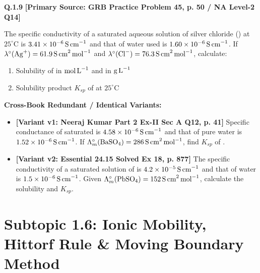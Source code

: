 \begin{problembox}
\textbf{Q.1.9} \hfill \textbf{[Primary Source: GRB Practice Problem 45, p. 50 / NA Level-2 Q14]}
\label{q:qb-c1-09}

The specific conductivity of a saturated aqueous solution of silver chloride () at $25^\circ\text{C}$ is $3.41 \times 10^{-6}\,\text{S\,cm}^{-1}$ and that of water used is $1.60 \times 10^{-6}\,\text{S\,cm}^{-1}$. If $\lambda^\circ(\ce{Ag+}) = 61.9\,\text{S\,cm}^2\,\text{mol}^{-1}$ and $\lambda^\circ(\ce{Cl-}) = 76.3\,\text{S\,cm}^2\,\text{mol}^{-1}$, calculate:
\begin{enumerate}[label=(\alph*)]
    \item Solubility of  in $\text{mol\,L}^{-1}$ and in $\text{g\,L}^{-1}$
    \item Solubility product $K_{sp}$ of  at $25^\circ\text{C}$
\end{enumerate}

\tcbline
\textbf{\color{accentamber}Cross-Book Redundant / Identical Variants:}
\begin{itemize}[leftmargin=*,itemsep=2pt]
    \item \textbf{[Variant v1: Neeraj Kumar Part 2 Ex-II Sec A Q12, p. 41]} Specific conductance of saturated  is $4.58 \times 10^{-6}\,\text{S\,cm}^{-1}$ and that of pure water is $1.52 \times 10^{-6}\,\text{S\,cm}^{-1}$. If $\Lambda_m^\circ(\ce{BaSO4}) = 286\,\text{S\,cm}^2\,\text{mol}^{-1}$, find $K_{sp}$ of .
    \item \textbf{[Variant v2: Essential  24.15 Solved Ex 18, p. 877]} The specific conductivity of a saturated solution of  is $4.2 \times 10^{-5}\,\text{S\,cm}^{-1}$ and that of water is $1.5 \times 10^{-6}\,\text{S\,cm}^{-1}$. Given $\Lambda_m^\circ(\ce{PbSO4}) = 152\,\text{S\,cm}^2\,\text{mol}^{-1}$, calculate the solubility and $K_{sp}$.
\end{itemize}
\end{problembox}

\section{Subtopic 1.6: Ionic Mobility, Hittorf Rule \& Moving Boundary Method}

